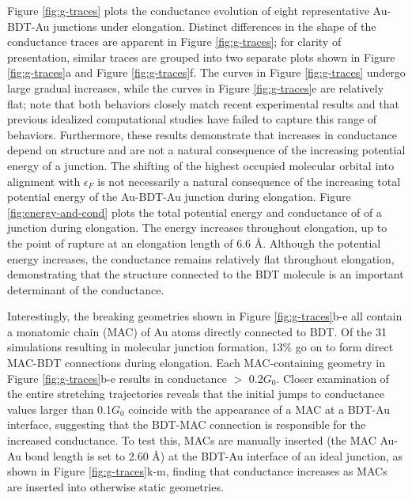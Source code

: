 \documentclass[10pt]{report}  %
\newcommand\findent{\hspace*{\parindent}}
\begin{document}
\findent Figure \ref{fig:g-traces} plots the conductance evolution of eight representative Au-BDT-Au junctions under elongation. Distinct differences in the shape of the conductance traces are apparent in Figure \ref{fig:g-traces}; for clarity of presentation, similar traces are grouped into two separate plots shown in Figure \ref{fig:g-traces}a and Figure \ref{fig:g-traces}f. The curves in Figure \ref{fig:g-traces} undergo large gradual increases, while the curves in Figure \ref{fig:g-traces}e are relatively flat; note that both behaviors closely match recent experimental results \cite{Bruot:2012} and that previous idealized computational studies have failed to capture this range of behaviors.\cite{Sergueev:2010,Pontes:2011} Furthermore, these results demonstrate that increases in conductance depend on structure and are not a natural consequence of the increasing potential energy of a junction. The shifting of the highest occupied molecular orbital into alignment with $\epsilon_{F}$ is not necessarily a natural consequence of the increasing total potential energy of the Au-BDT-Au junction during elongation. Figure \ref{fig:energy-and-cond} plots the total potential energy and conductance of of a junction during elongation. The energy increases throughout elongation, up to the point of rupture at an elongation length of 6.6 \AA.  Although the potential energy increases, the conductance remains relatively flat throughout elongation, demonstrating that the structure connected to the BDT molecule is an important determinant of the conductance.

Interestingly, the breaking geometries shown in Figure \ref{fig:g-traces}b-e all contain a monatomic chain (MAC) of Au atoms directly connected to BDT. Of the 31 simulations resulting in molecular junction formation, 13\% go on to form direct MAC-BDT connections during elongation.  Each MAC-containing geometry in Figure \ref{fig:g-traces}b-e results in conductance $>$ 0.2$G_{0}$. Closer examination of the entire stretching trajectories reveals that the initial jumps to conductance values larger than 0.1$G_{0}$ coincide with the appearance of a MAC at a BDT-Au interface, suggesting that the BDT-MAC connection is responsible for the increased conductance. To test this, MACs are manually inserted (the MAC Au-Au bond length is set to 2.60 \AA \cite{Zarechnaya:2008}) at the BDT-Au interface of an ideal junction, as shown in Figure \ref{fig:g-traces}k-m, finding that conductance increases as MACs are inserted into otherwise static geometries. 
\end{document}
